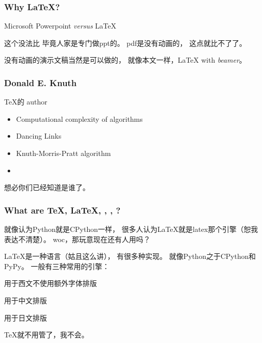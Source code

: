 \documentclass{beamer}
\begin{document}
    \begin{frame}
        \frametitle{Why \LaTeX{}?}
        Microsoft Powerpoint \textit{versus} \LaTeX\pause

        这个没法比\textellipsis
        毕竟人家是专门做ppt的。
        pdf是没有动画的，
        这点就比不了了。

        没有动画的演示文稿当然是可以做的，
        就像本文一样，\LaTeX{} with \textit{beamer}。
    \end{frame}
    \begin{frame}
        \frametitle{Donald E. Knuth}
        \TeX 的 author

        \begin{itemize}
            \item<2-> Computational complexity of algorithms
            \item<3-> Dancing Links
            \item<4-> Knuth-Morris-Pratt algorithm
            \item<5-> \textellipsis
        \end{itemize}\pause[6]

        想必你们已经知道是谁了。
    \end{frame}
    \begin{frame}
        \frametitle{What are \TeX{}, \LaTeX{}, , , \textellipsis?}
        就像认为Python就是CPython一样，
        很多人认为\LaTeX{}就是latex那个引擎（恕我表达不清楚）。
        woc，那玩意现在还有人用吗？

        \LaTeX{}是一种语言（姑且这么讲），
        有很多种实现。
        就像Python之于CPython和PyPy。
        一般有三种常用的引擎：\pause

        \begin{description}[labelwidth=\widthof{\hologo{LuaLaTeX} \textsubscript{with \hologo{LuaTeX}-ja}}]
            \item<2->[\hologo{pdfLaTeX}] 用于西文不使用额外字体排版
            \item<3->[\hologo{XeLaTeX} \textsubscript{with \hologo{Xe}CJK}] 用于中文排版
            \item<4->[\hologo{LuaLaTeX} \textsubscript{with \hologo{LuaTeX}-ja}] 用于日文排版
        \end{description}\pause[5]

        \TeX{}就不用管了，我不会。
    \end{frame}
\end{document}
